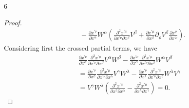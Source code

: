 \documentclass[11pt]{article}
\begin{document}
\begin{problem}{6}
\begin{enumerate}[label=(\alph*)]
\begin{proof}
\begin{equation}
\begin{aligned}
					                              & \quad - \frac{\partial x^{\prime\nu}}{\partial x^{\alpha}} W^{\alpha} \left( \frac{\partial^2 x^{\prime\mu}}{\partial x^{\prime\nu} \partial x^{\beta}} V^{\beta} + \frac{\partial x^{\prime\mu}}{\partial x^{\beta}} \partial_{\rho}V^{\beta} \frac{\partial x^{\rho}}{\partial x^{\prime\nu}}   \right).
				      \end{aligned}
			      \end{equation}
			      Considering first the crossed partial terms, we have
			      \begin{equation}
				      \label{eq:32}
				      \begin{aligned}
					       & \frac{\partial x^{\prime\nu}}{\partial x^{\alpha}} \frac{\partial^2 x^{\prime\mu}}{\partial x^{\prime\nu} \partial x^{\beta}} V^{\alpha} W^{\beta} - \frac{\partial x^{\prime\nu}}{\partial x^{\alpha}} \frac{\partial^2 x^{\prime\mu}}{\partial x^{\prime\nu} \partial x^{\beta}} W^{\alpha} V^{\beta}         \\[.5em]
					       & = \frac{\partial x^{\prime\nu}}{\partial x^{\gamma}} \frac{\partial^2 x^{\prime\mu}}{\partial x^{\prime\nu} \partial x^{\lambda}} V^{\gamma}W^{\lambda} - \frac{\partial x^{\prime\nu}}{\partial x^{\lambda}} \frac{\partial^2 x^{\prime\mu}}{\partial x^{\prime\nu} \partial x^{\gamma}} W^{\lambda}V^{\gamma} \\[.5em]
					       & = V^{\gamma}W^{\lambda} \left( \frac{\partial^2 x^{\prime\mu}}{\partial x^{\gamma} \partial x^{\lambda}} - \frac{\partial^2 x^{\prime\mu}}{\partial x^{\lambda} \partial x^{\gamma}}  \right) = 0.
				      \end{aligned}
			      \end{equation}


\end{proof}
\end{enumerate}
\end{problem}
\end{document}
